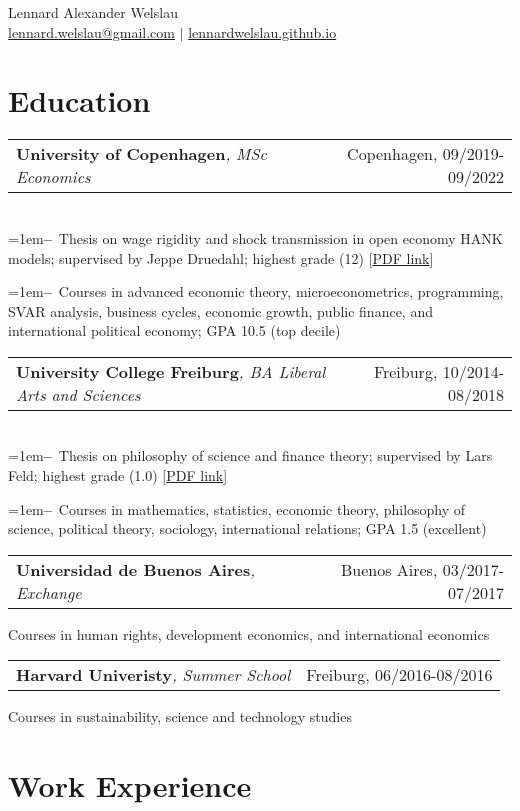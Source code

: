 \documentclass[A4,11pt]{article}
\makeatletter
\newcommand{\Subheading}[4]{   
    \begin{tabular*}{\textwidth}[t]{@{}l @{\extracolsep{\fill}} r@{}}
        \textbf{#1}\textit{\small #2} & \footnotesize #3 \\
    \end{tabular*}
    \small #4 
    \vspace{7pt}
}
\newcommand{\myitem}[1]{\hangindent=1em\hangafter=1\textbf{--}~#1\par}
\makeatother
\begin{document}
\begin{center}
    {\Large Lennard Alexander Welslau} \\ 
    \href{mailto:lennard.welslau@gmail.com}{lennard.welslau@gmail.com} $|$ \href{https://lennardwelslau.github.io/}{lennardwelslau.github.io}
\end{center}


\section{Education}

    \Subheading
        {University of Copenhagen}{, MSc Economics}{Copenhagen, 09/2019-09/2022}
        {\\
        \myitem{Thesis on wage rigidity and shock transmission in open economy HANK models; 
        supervised by Jeppe Druedahl; highest grade (12) 
        \footnotesize{[\href{https://lennardwelslau.github.io/research/Welslau_MA_Thesis_2022_Wage_Flexibility_Open_Economy_HANK.pdf}{PDF link}]}}
        \myitem{Courses in advanced economic theory, microeconometrics, programming, 
        SVAR analysis, business cycles, economic growth, public finance, and 
        international political economy; GPA 10.5 (top decile)}
        } 

    \Subheading
        {University College Freiburg}{, BA Liberal Arts and Sciences}{Freiburg, 10/2014-08/2018}
        {\\
        \myitem{Thesis on philosophy of science and finance theory; 
        supervised by Lars Feld; highest grade (1.0)
        \footnotesize{[\href{https://lennardwelslau.github.io/research/Welslau_BA_Thesis_2018_Lakatos_Finance_Theory.pdf}{PDF link}]}}
        \myitem{Courses in mathematics, statistics, economic theory, 
        philosophy of science, political theory, sociology, international 
        relations; GPA 1.5 (excellent)}
        }

    \Subheading
        {Universidad de Buenos Aires}{, Exchange}{Buenos Aires, 03/2017-07/2017}
        {Courses in human rights, development economics, and international economics}
    
    \Subheading
        {Harvard Univeristy}{, Summer School}{Freiburg, 06/2016-08/2016}
        {Courses in sustainability, science and technology studies}

\section{Work Experience}
\end{document}
